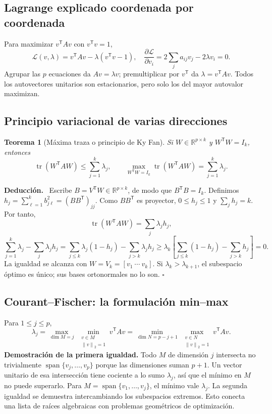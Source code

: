 \documentclass[11pt,a4paper]{article}
\newcommand{\R}{\mathbb R}
\newcommand{\T}{^{\mathsf T}}
\newcommand{\norm}[1]{\left\lVert #1\right\rVert}
\DeclareMathOperator{\spanop}{span}
\DeclareMathOperator{\tr}{tr}
\newenvironment{deduccion}{\par\textbf{Deducción.}\ }{\hfill$\square$\par}
\newtheorem{teorema}{Teorema}[section]
\theoremstyle{definition}
\begin{document}
\subsection{Lagrange explicado coordenada por coordenada}
Para maximizar $v\T Av$ con $v\T v=1$,
\[
\mathcal L(v,\lambda)=v\T Av-\lambda(v\T v-1),\quad
\frac{\partial\mathcal L}{\partial v_i}=2\sum_ja_{ij}v_j-2\lambda v_i=0.
\]
Agrupar las $p$ ecuaciones da $Av=\lambda v$; premultiplicar por $v\T$ da $\lambda=v\T Av$. Todos los autovectores unitarios son estacionarios, pero solo los del mayor autovalor maximizan.
\subsection{Principio variacional de varias direcciones}
\begin{teorema}[Máxima traza o principio de Ky Fan]
Si $W\in\R^{p\times k}$ y $W\T W=I_k$, entonces
\[
\tr(W\T AW)\le\sum_{j=1}^k\lambda_j,
\qquad\max_{W\T W=I_k}\tr(W\T AW)=\sum_{j=1}^k\lambda_j.
\]
\end{teorema}
\begin{deduccion}
Escribe $B=V\T W\in\R^{p\times k}$, de modo que $B\T B=I_k$. Definimos $h_j=\sum_{\ell=1}^k b_{j\ell}^2=(BB\T)_{jj}$. Como $BB\T$ es proyector, $0\le h_j\le1$ y $\sum_jh_j=k$. Por tanto,
\[
\tr(W\T AW)=\sum_j\lambda_jh_j,
\]
\[
\sum_{j=1}^k\lambda_j-\sum_j\lambda_jh_j
=\sum_{j\le k}\lambda_j(1-h_j)-\sum_{j>k}\lambda_jh_j
\ge\lambda_k\left[\sum_{j\le k}(1-h_j)-\sum_{j>k}h_j\right]=0.
\]
La igualdad se alcanza con $W=V_k=[v_1\ \cdots\ v_k]$. Si $\lambda_k>\lambda_{k+1}$, el subespacio óptimo es único; sus bases ortonormales no lo son.
\end{deduccion}
\subsection{Courant--Fischer: la formulación min--max}
Para $1\le j\le p$,
\[
\lambda_j=\max_{\dim M=j}\ \min_{\substack{v\in M\\\norm v_2=1}}v\T Av
=\min_{\dim N=p-j+1}\ \max_{\substack{v\in N\\\norm v_2=1}}v\T Av.
\]
\textbf{Demostración de la primera igualdad.} Todo $M$ de dimensión $j$ intersecta no trivialmente $\spanop\{v_j,\ldots,v_p\}$ porque las dimensiones suman $p+1$. Un vector unitario de esa intersección tiene cociente a lo sumo $\lambda_j$, así que el mínimo en $M$ no puede superarlo. Para $M=\spanop\{v_1,\ldots,v_j\}$, el mínimo vale $\lambda_j$. La segunda igualdad se demuestra intercambiando los subespacios extremos. Esto conecta una lista de raíces algebraicas con problemas geométricos de optimización.
\end{document}
